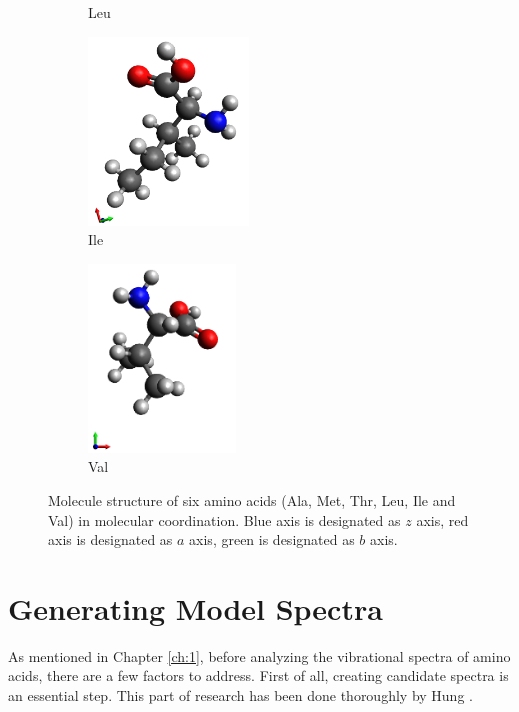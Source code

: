 \begin{figure}
\begin{subfigure}{.5\textwidth}
  \caption{Leu}
  \label{fig:sfig4}
\end{subfigure}
\begin{subfigure}{.5\textwidth}
  \centering
  \includegraphics[height=5cm]{Figures/Ile.png}
  \caption{Ile}
  \label{fig:sfig5}
\end{subfigure}
\begin{subfigure}{.5\textwidth}
  \centering
  \includegraphics[height=5cm]{Figures/Val.png}
  \caption{Val}
  \label{fig:sfig6}
\end{subfigure}
\caption{Molecule structure of six amino acids (Ala, Met, Thr, Leu, Ile and Val) in molecular coordination. Blue axis is designated as $z$ axis, red axis is designated as $a$ axis, green is designated as $b$ axis.}
\label{fig:fig}
\end{figure}

\section{Generating Model Spectra}
As mentioned in Chapter \ref{ch:1}, before analyzing the vibrational spectra of amino acids, there are a few factors to address. First of all, creating candidate spectra is an essential step. This part of research has been done thoroughly by Hung \cite{KuoKaiHung:Thesis:2015}. \\

